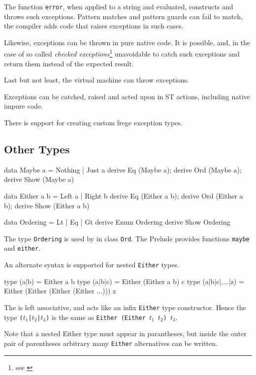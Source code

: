 The function \texttt{error}, when applied to a string and evaluated, 
constructs and throws such exceptions. Pattern matches and pattern guards
can fail to match, the compiler adds code that raises exceptions in such cases.

Likewise, exceptions can be thrown in pure native code. 
It is possible, and, in the case of so called 
\emph{checked exceptions}\footnote{see \cite[§11.2]{langspec3}}
unavoidable to catch such exceptions and return them instead of the expected result.

Last but not least, the \java{} virtual machine can throw exceptions. 

Exceptions can be catched, raised and acted upon in ST actions,
including native impure code. 

There is support for creating custom frege exception types. 


\subsection{Other Types}

\begin{code}
data Maybe a = Nothing | Just a
derive Eq (Maybe a); derive Ord (Maybe a); derive Show (Maybe a)

data Either a b = Left a | Right b
derive Eq (Either a b); derive Ord (Either a b);
derive Show (Either a b)

data Ordering = Lt | Eq | Gt
derive Enum Ordering
derive Show Ordering
\end{code}

The type \texttt{Ordering} is used by \sym{(<=>)} in class \texttt{Ord}.
The Prelude provides functions \texttt{maybe} and \texttt{either}.

An alternate syntax is supported for nested \texttt{Either} types. \label{nested-either}

\begin{code}
type (a|b) = Either a b
type (a|b|c) = Either (Either a b) c
type (a|b|c|....|z) = Either (Either (Either (Either ...))) z
\end{code}

The \sym{|} is left associative, and acts like an infix \texttt{Either} type constructor.
Hence the type 
\texttt{($t_1$|$t_2$|$t_3$)} is the same as 
\texttt{Either (Either $t_1$ $t_2$) $t_3$}.

Note that a nested Either type must appear in parantheses, 
but inside the outer pair of parentheses arbitrary many \texttt{Either} alternatives can be written.

